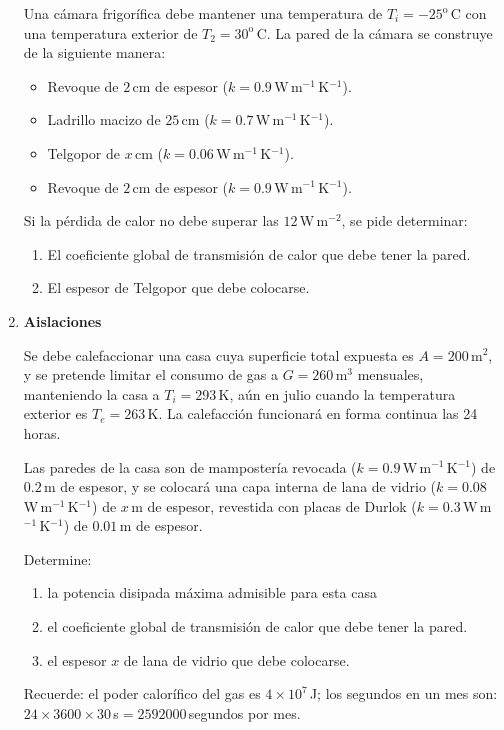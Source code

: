 \documentclass[a4paper,12pt]{article}
\begin{document}
\begin{enumerate}
Una cámara frigorífica debe mantener una temperatura de $T_i=-25^\mathrm{o}$\,C
con una temperatura exterior de $T_2=30^\mathrm{o}$\,C. La pared de la cámara
se construye de la siguiente manera:
\begin{itemize}
\item Revoque de $2$\,cm de espesor
($k=0.9$\,W\,m$^{-1}$\,K$^{-1}$).
\item Ladrillo macizo de $25$\,cm
($k=0.7$\,W\,m$^{-1}$\,K$^{-1}$).
\item Telgopor de $x$\,cm ($k=0.06$\,W\,m$^{-1}$\,K$^{-1}$).
\item Revoque de $2$\,cm de espesor
($k=0.9$\,W\,m$^{-1}$\,K$^{-1}$).
\end{itemize}
Si la pérdida de calor no debe superar las $12$\,W\,m$^{-2}$, se
pide determinar:
\begin{enumerate}
\item El coeficiente global de transmisión de calor que debe tener la pared.
\item El espesor de Telgopor que debe colocarse.
\end{enumerate}

\item {\bf{Aislaciones}}

Se debe calefaccionar una casa cuya superficie total expuesta es
$A=200$\,m$^2$, y se pretende limitar el consumo de gas a $G=260$\,m$^3$
mensuales, manteniendo la casa a $T_i=293$\,K, aún en julio cuando la
temperatura exterior es $T_e=263$\,K. La calefacción funcionará en forma continua las 24 horas.

Las paredes de la casa son de mampostería revocada
($k=0.9$\,W\,m$^{-1}$\,K$^{-1}$) de $0.2$\,m de espesor, y se colocará una capa
interna de lana de vidrio ($k=0.08$\,W\,m$^{-1}$\,K$^{-1}$) de $x$\,m de
espesor, revestida con placas de Durlok ($k=0.3$\,W\,m$^{-1}$\,K$^{-1}$) de
$0.01$\,m de espesor.

Determine:

\begin{enumerate}
\item la potencia disipada máxima admisible para esta casa
\item el coeficiente global de transmisión de calor que debe
tener la pared.
\item el espesor $x$ de lana de vidrio que debe colocarse.
\end{enumerate}

Recuerde: el poder calorífico del gas es $4\times 10^7$\,J; los segundos en un mes son:$24\times3600\times30$\,s$=2592000$\,segundos por mes.

\end{enumerate}
\end{document}
